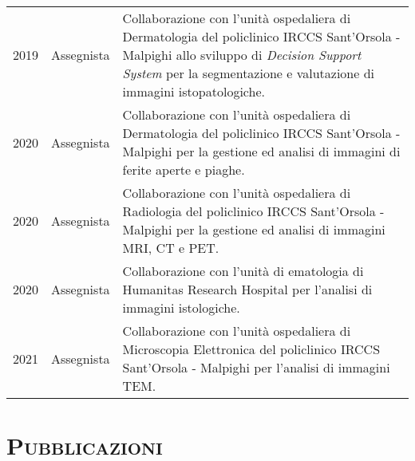 \documentclass[a4paper,11pt]{article}
\begin{document}
\begin{tabular}{llp{12cm}}
  2019\textemdash2022 & Assegnista      & Collaborazione con l'unità ospedaliera di Dermatologia del policlinico IRCCS Sant'Orsola - Malpighi allo sviluppo di \emph{Decision Support System} per la segmentazione e valutazione di immagini istopatologiche.\\
  2020\textemdash2022 & Assegnista      & Collaborazione con l'unità ospedaliera di Dermatologia del policlinico IRCCS Sant'Orsola - Malpighi per la gestione ed analisi di immagini di ferite aperte e piaghe.\\
  2020\textemdash2022 & Assegnista      & Collaborazione con l'unità ospedaliera di Radiologia del policlinico IRCCS Sant'Orsola - Malpighi per la gestione ed analisi di immagini MRI, CT e PET.\\
  2020\textemdash2022 & Assegnista      & Collaborazione con l'unità di ematologia di Humanitas Research Hospital per l'analisi di immagini istologiche.\\
  2021\textemdash2022 & Assegnista      & Collaborazione con l'unità ospedaliera di Microscopia Elettronica del policlinico IRCCS Sant'Orsola - Malpighi per l'analisi di immagini TEM.\\

\end{tabular}




\vspace*{0.5cm}
\section*{\scshape{Pubblicazioni}}
\end{document}
